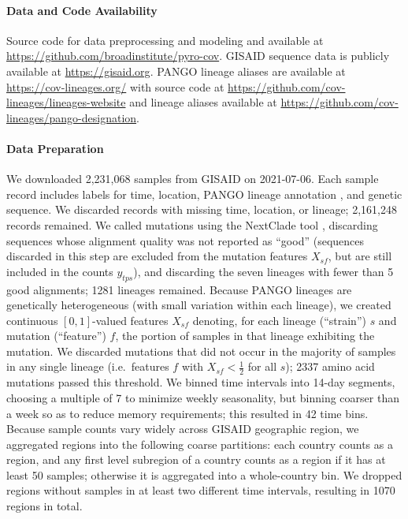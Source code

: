 \documentclass[12pt]{article}
\begin{document}
\paragraph*{Data and Code Availability}

Source code for data preprocessing and modeling and available at
\url{https://github.com/broadinstitute/pyro-cov}.
GISAID sequence data is publicly available at
\url{https://gisaid.org}.
PANGO lineage aliases are available at \url{https://cov-lineages.org/} with source code at \url{https://github.com/cov-lineages/lineages-website} and lineage aliases available at \url{https://github.com/cov-lineages/pango-designation}.

\paragraph*{Data Preparation}

We downloaded 2,231,068 samples from GISAID 
\cite{elbe2017gisaid} on 2021-07-06.
Each sample record includes labels for time, location, PANGO lineage annotation \cite{rambaut2020dynamic}, and genetic sequence.
We discarded records with missing time, location, or lineage; 2,161,248 records remained.
We called mutations using the NextClade tool \cite{aksamentov2020nextclade}, discarding sequences whose alignment quality was not reported as ``good'' (sequences discarded in this step are excluded from the mutation features $X_{sf}$, but are still included in the counts $y_{tps}$), and discarding the seven lineages with fewer than 5 good alignments; 1281 lineages remained.
Because PANGO lineages are genetically heterogeneous (with small variation within each lineage), we created continuous $[0, 1]$-valued features $X_{sf}$ denoting, for each lineage (``strain'') $s$ and mutation (``feature'') $f$, the portion of samples in that lineage exhibiting the mutation.
We discarded mutations that did not occur in the majority of samples in any single lineage (i.e.~features $f$ with $X_{sf}<\tfrac{1}{2}$ for all $s$); 2337 amino acid mutations passed this threshold.
We binned time intervals into 14-day segments, choosing a multiple of 7 to minimize weekly seasonality, but binning coarser than a week so as to reduce memory requirements; this resulted in 42 time bins.
Because sample counts vary widely across GISAID geographic region, we aggregated regions into the following coarse partitions: each country counts as a region, and any first level subregion of a country counts as a region if it has at least 50 samples; otherwise it is aggregated into a whole-country bin.
We dropped regions without samples in at least two different time intervals, resulting in 1070 regions in total.
\end{document}
